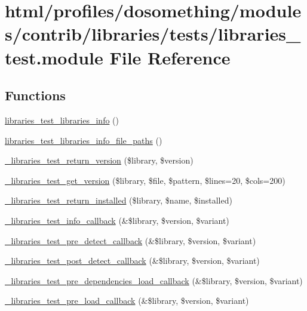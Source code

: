 \hypertarget{libraries__test_8module}{
\section{html/profiles/dosomething/modules/contrib/libraries/tests/libraries\_\-test.module File Reference}
\label{libraries__test_8module}
}
\subsection*{Functions}
\begin{DoxyCompactItemize}
\item 
\hyperlink{libraries__test_8module_aa860ec3906a40f89fb93fd16fa00e13e}{libraries\_\-test\_\-libraries\_\-info} ()
\item 
\hyperlink{libraries__test_8module_a303e0ac6030ebace3084c766fe0e6d04}{libraries\_\-test\_\-libraries\_\-info\_\-file\_\-paths} ()
\item 
\hyperlink{libraries__test_8module_adb9e4bcd0364b383e2b4e63322c59515}{\_\-libraries\_\-test\_\-return\_\-version} (\$library, \$version)
\item 
\hyperlink{libraries__test_8module_a9fca8604e99866a4f25e34093cf89e1b}{\_\-libraries\_\-test\_\-get\_\-version} (\$library, \$file, \$pattern, \$lines=20, \$cols=200)
\item 
\hyperlink{libraries__test_8module_aa90217dd3a963d0d60b2f9c96c80813e}{\_\-libraries\_\-test\_\-return\_\-installed} (\$library, \$name, \$installed)
\item 
\hyperlink{libraries__test_8module_accd1b2af2131239fc9a0ec8acd69590a}{\_\-libraries\_\-test\_\-info\_\-callback} (\&\$library, \$version, \$variant)
\item 
\hyperlink{libraries__test_8module_ae1c8a142c12a8511ee7c915d99e401e7}{\_\-libraries\_\-test\_\-pre\_\-detect\_\-callback} (\&\$library, \$version, \$variant)
\item 
\hyperlink{libraries__test_8module_a3e5a93f087b4be8f9c29cbce815d86eb}{\_\-libraries\_\-test\_\-post\_\-detect\_\-callback} (\&\$library, \$version, \$variant)
\item 
\hyperlink{libraries__test_8module_acf93be0f4acdd042e96854daefdc078d}{\_\-libraries\_\-test\_\-pre\_\-dependencies\_\-load\_\-callback} (\&\$library, \$version, \$variant)
\item 
\hyperlink{libraries__test_8module_a30b3f98d4f5f93bafd1e901d4b55ee84}{\_\-libraries\_\-test\_\-pre\_\-load\_\-callback} (\&\$library, \$version, \$variant)

\end{DoxyCompactItemize}
